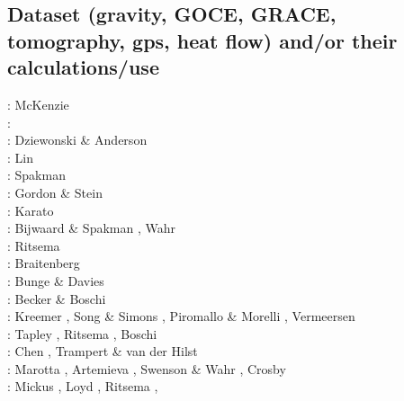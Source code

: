 \subsection{Dataset (gravity, GOCE, GRACE, tomography, gps, heat flow) 
and/or their calculations/use}

\begin{scriptsize}
\nineteensixtyseven: McKenzie \cite{mcke67}\\
\nineteenseventyseven: \cite{rola77}\\
\nineteeneightyone: Dziewonski \& Anderson \cite{dzan81}\\
\nineteenninety: Lin \etal \cite{lips90}\\
\nineteenninetyone: Spakman \cite{spak91}\\
\nineteenninetytwo: Gordon \& Stein \cite{gost92}\\
\nineteenninetythree: Karato \cite{kara93}\\
\nineteenninetyeight: Bijwaard \& Spakman \cite{bisp98}, Wahr \etal \cite{wamb98}\\
\nineteenninetynine: Ritsema \etal \cite{rivw99}\\
\twothousand: Braitenberg \etal \cite{brzf00}\\
\twothousandone: Bunge \& Davies \cite{buda01}\\
\twothousandtwo: Becker \& Boschi \cite{bebo02}\\
\twothousandthree: Kreemer \etal \cite{krhh03}, Song \& Simons \cite{sosi03}, 
                   Piromallo \& Morelli \cite{pimo03}, Vermeersen \cite{verm03}\\
\twothousandfour: Tapley \etal \cite{tabr04}, Ritsema \etal \cite{rivw04}, Boschi \etal \cite{boek04}\\
\twothousandfive: Chen \etal \cite{chrw05}, Trampert \& van der Hilst \cite{trva05}\\
\twothousandsix: Marotta \etal \cite{masr06}, Artemieva \cite{arte06}, 
                 Swenson \& Wahr \cite{swwa06}, Crosby \etal \cite{crms06}\\
\twothousandseven: Mickus \etal \cite{mitk07}, Loyd \etal \cite{lobc07}, Ritsema \etal \cite{rimb07}, 

\end{scriptsize}

